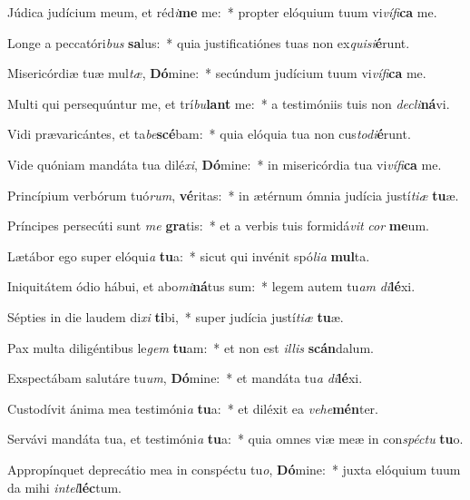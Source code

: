 \item Júdica judícium meum, et réd\textit{i}\textbf{me} me:~* propter elóquium tuum vi\textit{ví}\textit{fi}\textbf{ca} me.
\item Longe a peccatóri\textit{bus} \textbf{sa}lus:~* quia justificatiónes tuas non ex\textit{qui}\textit{si}\textbf{é}runt.
\item Misericórdiæ tuæ mul\textit{tæ}, \textbf{Dó}mine:~* secúndum judícium tuum vi\textit{ví}\textit{fi}\textbf{ca} me.
\item Multi qui persequúntur me, et trí\textit{bu}\textbf{lant} me:~* a testimóniis tuis non \textit{de}\textit{cli}\textbf{ná}vi.
\item Vidi prævaricántes, et ta\textit{be}\textbf{scé}bam:~* quia elóquia tua non cus\textit{to}\textit{di}\textbf{é}runt.
\item Vide quóniam mandáta tua dilé\textit{xi}, \textbf{Dó}mine:~* in misericórdia tua vi\textit{ví}\textit{fi}\textbf{ca} me.
\item Princípium verbórum tuó\textit{rum}, \textbf{vé}ritas:~* in ætérnum ómnia judícia justí\textit{ti}\textit{æ} \textbf{tu}æ.
\item Príncipes persecúti sunt \textit{me} \textbf{gra}tis:~* et a verbis tuis formidá\textit{vit} \textit{cor} \textbf{me}um.
\item Lætábor ego super elóqui\textit{a} \textbf{tu}a:~* sicut qui invénit spó\textit{li}\textit{a} \textbf{mul}ta.
\item Iniquitátem ódio hábui, et abo\textit{mi}\textbf{ná}tus sum:~* legem autem tu\textit{am} \textit{di}\textbf{lé}xi.
\item Sépties in die laudem di\textit{xi} \textbf{ti}bi,~* super judícia justí\textit{ti}\textit{æ} \textbf{tu}æ.
\item Pax multa diligéntibus le\textit{gem} \textbf{tu}am:~* et non est \textit{il}\textit{lis} \textbf{scán}dalum.
\item Exspectábam salutáre tu\textit{um}, \textbf{Dó}mine:~* et mandáta tu\textit{a} \textit{di}\textbf{lé}xi.
\item Custodívit ánima mea testimóni\textit{a} \textbf{tu}a:~* et diléxit ea \textit{ve}\textit{he}\textbf{mén}ter.
\item Servávi mandáta tua, et testimóni\textit{a} \textbf{tu}a:~* quia omnes viæ meæ in con\textit{spéc}\textit{tu} \textbf{tu}o.
\item Appropínquet deprecátio mea in conspéctu tu\textit{o}, \textbf{Dó}mine:~* juxta elóquium tuum da mihi \textit{in}\textit{tel}\textbf{léc}tum.
